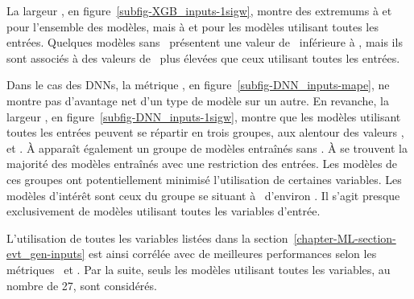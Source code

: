 La largeur \OneSigmaWidth, en figure~\ref{subfig-XGB_inputs-1sigw},
montre des extremums
à  et 
pour l'ensemble des modèles,
mais
à  et 
pour les modèles utilisant toutes les entrées.
Quelques modèles sans \mT\ présentent
une valeur de \OneSigmaWidth\
inférieure à ,
mais ils sont associés à des valeurs de \LossMAPE\
plus élevées que ceux utilisant toutes les entrées.
\par
Dans le cas des DNNs,
la métrique \LossMAPE, en figure~\ref{subfig-DNN_inputs-mape},
ne montre pas d'avantage net d'un type de modèle sur un autre.
En revanche,
la largeur \OneSigmaWidth, en figure~\ref{subfig-DNN_inputs-1sigw},
montre que les modèles utilisant toutes les entrées peuvent se répartir en trois groupes,
aux alentour des valeurs
\todo{?}, \todo{?} et \todo{?}.
À  apparaît également un groupe de modèles entraînés sans \mT.
À \todo{?2e} se trouvent la majorité des modèles entraînés avec une restriction des entrées.
Les modèles de ces groupes ont potentiellement minimisé l'utilisation de certaines variables.
Les modèles d'intérêt sont ceux du groupe se situant à \OneSigmaWidth\ d'environ \todo{?1er}.
Il s'agit presque exclusivement de modèles utilisant toutes les variables d'entrée.
\par
L'utilisation de toutes les variables listées dans la section~\ref{chapter-ML-section-evt_gen-inputs}
est ainsi corrélée avec de meilleures performances
selon les métriques
\LossMAPE\
et \OneSigmaWidth.
Par la suite, seuls les modèles utilisant toutes les variables, au nombre de 27, sont considérés.


